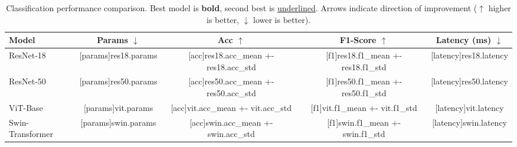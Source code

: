 \begin{table}[htbp]
\centering
\begin{threeparttable}
\caption{
Classification performance comparison.
Best model is \textbf{bold}, second best is \underline{underlined}.
Arrows indicate direction of improvement ($\uparrow$ higher is better, $\downarrow$ lower is better).
}
\label{tab:model_comparison}
\begin{tabular}{lcccc}
\toprule
\textbf{Model} & \textbf{Params $\downarrow$} & \textbf{Acc $\uparrow$} & \textbf{F1-Score $\uparrow$} & \textbf{Latency (ms) $\downarrow$} \\
\midrule
ResNet-18        & [params]{res18.params} & [acc]{res18.acc_mean +- res18.acc_std} & [f1]{res18.f1_mean +- res18.f1_std} & [latency]{res18.latency} \\
ResNet-50        & [params]{res50.params} & [acc]{res50.acc_mean +- res50.acc_std} & [f1]{res50.f1_mean +- res50.f1_std} & [latency]{res50.latency} \\
ViT-Base         & [params]{vit.params}   & [acc]{vit.acc_mean +- vit.acc_std}     & [f1]{vit.f1_mean +- vit.f1_std}     & [latency]{vit.latency} \\
Swin-Transformer & [params]{swin.params}  & [acc]{swin.acc_mean +- swin.acc_std}   & [f1]{swin.f1_mean +- swin.f1_std}   & [latency]{swin.latency} \\
\bottomrule
\end{tabular}
\end{threeparttable}
\end{table}
